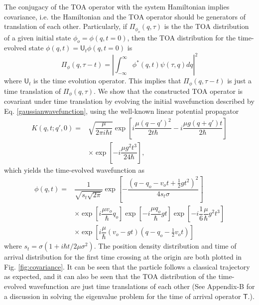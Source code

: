 \documentclass[%
 reprint,
 amsmath,amssymb,
 aps,
]{revtex4-1}
\newcommand{\opr}[1]{\ensuremath{\mathbf{\mathsf{#1}}}}
\newcommand{\abs}[1]{\ensuremath{\left|#1\right|}}
\begin{document}
The conjugacy of the TOA operator with the system Hamiltonian implies covariance, i.e. the Hamiltonian and the TOA operator should be generators of translation of each other. Particularly, if $\Pi_{\phi_o}(q,\tau)$ is the the TOA distribution of a given initial state $\phi_o=\phi(q,t=0)$, then the TOA distribution for the time-evolved state $\phi(q,t)=\opr{U}_t \phi(q,t=0)$ is 
\begin{equation}
\Pi_{\phi}(q,\tau-t) = \abs{\int_{-\infty}^{\infty}\phi^{*}(q,t)\psi(\tau,q)dq}^2
\label{toadistributiontevo}
\end{equation}
where $\opr{U}_t$ is the time evolution operator. This implies that $\Pi_{\phi}(q,\tau-t)$ is just a time translation of $\Pi_{\phi}(q,\tau)$. We show that the constructed TOA operator is covariant under time translation by evolving the initial wavefunction described by Eq. \eqref{gaussianwavefunction}, using the well-known linear potential propagator
\begin{align}
K(q,t;q',0)=&\sqrt{\dfrac{\mu}{2\pi i \hbar t}}\exp\left[i\dfrac{\mu(q-q')^2}{2 t \hbar}-i\dfrac{\mu g (q+q')t}{2\hbar}\right]\nonumber \\
&\times \exp\left[-i\dfrac{\mu g^2 t^3}{24 \hbar}\right],
\end{align}
which yields the time-evolved wavefunction as
\begin{align}
\phi(q,t)=& \dfrac{1}{\sqrt{s_t \sqrt{2\pi}}}\exp\left[-\dfrac{(q-q_o-v_ot+\frac{1}{2}gt^2)^2}{4 s_t \sigma}\right] \nonumber \\
&\times \exp\left[i\dfrac{\mu v_o}{\hbar}q_o\right]\exp\left[-i\dfrac{\mu q_o}{\hbar}gt\right]\exp\left[-i\dfrac{1}{6}\dfrac{\mu}{\hbar}g^2t^3\right] \nonumber \\
& \times \exp\left[i\dfrac{\mu}{\hbar}\left(v_o-gt\right)\left(q-q_o-\frac{1}{2}v_o t\right)\right] 
\end{align}
where $s_t=\sigma(1+i\hbar t/ 2 \mu \sigma^2)$. The position density distribution and time of arrival distribution for the first time crossing at the origin are both plotted in Fig. \ref{fig:covariance}. It can be seen that the particle follows a classical trajectory as expected, and it can also be seen that the TOA distribution of the time-evolved wavefunction are just time translations of each other (See Appendix-B for a discussion in solving the eigenvalue problem for the time of arrival operator $\opr{T}$.).
\end{document}
